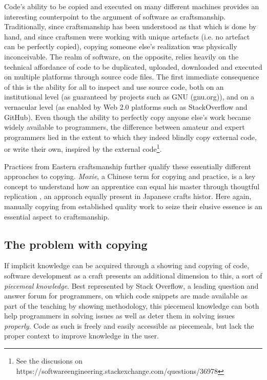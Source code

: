 \documentclass{article}
\begin{document}
Code's ability to be copied and executed on many different machines provides an interesting counterpoint to the argument of software as craftsmanship. Traditionally, since craftsmanship has been understood as that which is done by hand, and since craftsmen were working with unique artefacts (i.e. no artefact can be perfectly copied), copying someone else's realization was physically inconceivable. The realm of software, on the opposite, relies heavily on the technical affordance of code to be duplicated, uploaded, downloaded and executed on multiple platforms through source code files\cite{manovich_language_2001}. The first immediate consequence of this is the ability for all to inspect and use source code, both on an institutional level (as guaranteed by projects such as GNU (gnu.org)), and on a vernacular level (as enabled by Web 2.0 platforms such as StackOverflow and GitHub). Even though the ability to perfectly copy anyone else's work became widely available to programmers, the difference between amateur and expert programmers lied in the extent to which they indeed blindly copy external code, or write their own, inspired by the external code\footnote{See the discusions on https://softwareengineering.stackexchange.com/questions/36978}.

Practices from Eastern craftsmanship further qualify these essentially different approaches to copying. \emph{Moxie}, a Chinese term for copying and practice, is a key concept to understand how an apprentice can equal his master through thougtful replication \cite{man_influence_2015}, an approach equally present in Japanese crafts histor\cite{jordan_copying_2003}. Here again, manually copying from established quality work to seize their elusive essence is an essential aspect to craftsmanship.

\subsection{The problem with copying}

If implicit knowledge can be acquired through a showing and copying of code, software development as a craft presents an additional dimension to this, a sort of \emph{piecemeal knowledge}. Best represented by Stack Overflow, a leading question and answer forum for programmers, on which code snippets are made available as part of the teaching by showing methodology, this piecemeal knowledge can both help programmers in solving issues as well as deter them in solving issues \textit{properly}\cite{treude_understanding_2017}. Code as such is freely and easily accessible as piecemeals, but lack the proper context to improve knowledge in the user.
\end{document}
